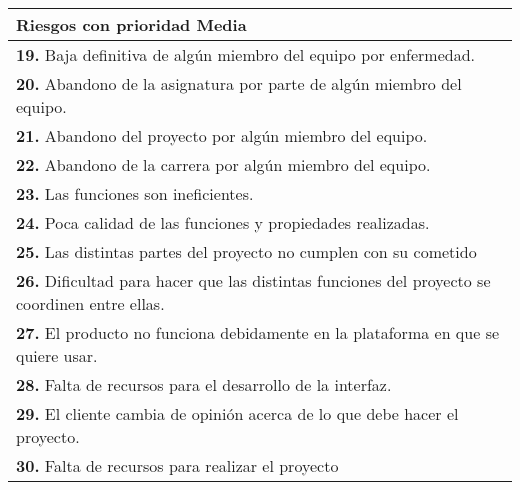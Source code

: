 \documentclass[spanish,a4paper,12pt]{report}	%
\begin{document}
			\begin{tabular}{|p{12cm}|}
				\hline
				\textbf{Riesgos con prioridad Media}\\ \hline \hline
				\textbf{19.} Baja definitiva de algún miembro del equipo por enfermedad.\\ \hline 
				\textbf{20.} Abandono de la asignatura por parte de algún miembro del equipo.\\ \hline
				\textbf{21.} Abandono del proyecto por algún miembro del equipo. \\ \hline
				\textbf{22.} Abandono de la carrera por algún miembro del equipo. \\ \hline
				\textbf{23.} Las funciones son ineficientes.\\ \hline
				\textbf{24.} Poca calidad de las funciones y propiedades realizadas. \\ \hline
				\textbf{25.} Las distintas partes del proyecto no cumplen con su cometido \\ \hline
				\textbf{26.} Dificultad para hacer que las distintas funciones del proyecto se coordinen entre ellas. \\ \hline
				\textbf{27.} El producto no funciona debidamente en la plataforma en que se quiere usar. \\ \hline
				\textbf{28.} Falta de recursos para el desarrollo de la interfaz. \\ \hline
				\textbf{29.} El cliente cambia de opinión acerca de lo que debe hacer el proyecto. \\ \hline
				\textbf{30.} Falta de recursos para realizar el proyecto \\ \hline
			\end{tabular}
			
				\ \\
				\ \\
			
\end{document}
